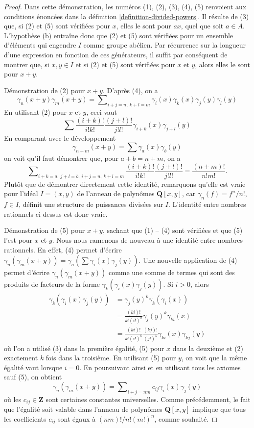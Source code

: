 \begin{proof}
Dans cette démonstration, les numéros (1), (2), (3), (4), (5) renvoient aux
conditions énoncées dans la définition \ref{definition-divided-powers}.
Il résulte de (3) que, si (2) et (5) sont vérifiées pour $x$, elles le sont
pour $ax$, quel que soit $a \in A$. L'hypothèse (b) entraîne donc que
(2) et (5) sont vérifiées pour un ensemble d'éléments qui engendre $I$
comme groupe abélien. Par récurrence sur la longueur d'une expression en
fonction de ces générateurs, il suffit par conséquent de montrer que, si
$x, y \in I$ et si (2) et (5) sont vérifiées pour $x$ et $y$, alors elles
le sont pour $x + y$.

\medskip\noindent
Démonstration de (2) pour $x + y$. D'après (4), on a
$$
\gamma_n(x + y)\gamma_m(x + y) =
\sum\nolimits_{i + j = n,\ k + l = m}
\gamma_i(x)\gamma_k(x)\gamma_j(y)\gamma_l(y)
$$
En utilisant (2) pour $x$ et $y$, ceci vaut
$$
\sum \frac{(i + k)!}{i!k!}\frac{(j + l)!}{j!l!}
\gamma_{i + k}(x)\gamma_{j + l}(y)
$$
En comparant avec le développement
$$
\gamma_{n + m}(x + y) = \sum \gamma_a(x)\gamma_b(y)
$$
on voit qu'il faut démontrer que, pour $a + b = n + m$, on a
$$
\sum\nolimits_{i + k = a,\ j + l = b,\ i + j = n,\ k + l = m}
\frac{(i + k)!}{i!k!}\frac{(j + l)!}{j!l!}
=
\frac{(n + m)!}{n!m!}.
$$
Plutôt que de démontrer directement cette identité, remarquons qu'elle est
vraie pour l'idéal $I = (x, y)$ de l'anneau de polynômes
$\mathbf{Q}[x, y]$, car $\gamma_n(f) = f^n/n!$, $f \in I$, définit une
structure de puissances divisées sur $I$. L'identité entre nombres rationnels
ci-dessus est donc vraie.

\medskip\noindent
Démonstration de (5) pour $x + y$, sachant que (1) -- (4) sont vérifiées et
que (5) l'est pour $x$ et $y$. Nous nous ramenons de nouveau à une identité
entre nombres rationnels. En effet, (4) permet d'écrire
$\gamma_n(\gamma_m(x + y)) = \gamma_n(\sum \gamma_i(x)\gamma_j(y))$.
Une nouvelle application de (4) permet d'écrire
$\gamma_n(\gamma_m(x + y))$ comme une somme de termes qui sont des produits
de facteurs de la forme $\gamma_k(\gamma_i(x)\gamma_j(y))$.
Si $i > 0$, alors
\begin{align*}
\gamma_k(\gamma_i(x)\gamma_j(y)) & =
\gamma_j(y)^k\gamma_k(\gamma_i(x)) \\
& = \frac{(ki)!}{k!(i!)^k} \gamma_j(y)^k \gamma_{ki}(x) \\
& =
\frac{(ki)!}{k!(i!)^k} \frac{(kj)!}{(j!)^k} \gamma_{ki}(x) \gamma_{kj}(y)
\end{align*}
où l'on a utilisé (3) dans la première égalité, (5) pour $x$ dans la
deuxième et (2) exactement $k$ fois dans la troisième. En utilisant (5)
pour $y$, on voit que la même égalité vaut lorsque $i = 0$. En poursuivant
ainsi et en utilisant tous les axiomes sauf (5), on obtient
$$
\gamma_n(\gamma_m(x + y)) =
\sum\nolimits_{i + j = nm} c_{ij}\gamma_i(x)\gamma_j(y)
$$
où les $c_{ij} \in \mathbf{Z}$ sont certaines constantes universelles. Comme
précédemment, le fait que l'égalité soit valable dans l'anneau de polynômes
$\mathbf{Q}[x, y]$ implique que tous les coefficients $c_{ij}$ sont égaux à
$(nm)!/n!(m!)^n$, comme souhaité.
\end{proof}

